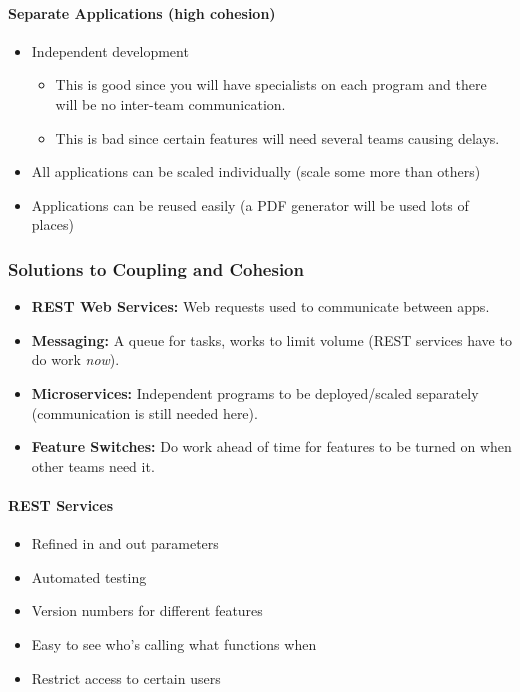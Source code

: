 \paragraph{Separate Applications (high cohesion)}\label{par:separate_applications_high_cohesion_}

\begin{itemize}
    \item Independent development
          \begin{itemize}
              \item This is good since you will have specialists on each program and there will be no inter-team communication.
              \item This is bad since certain features will need several teams causing delays.
          \end{itemize}
    \item All applications can be scaled individually (scale some more than others)
    \item Applications can be reused easily (a PDF generator will be used lots of places)
\end{itemize}

\subsubsection{Solutions to Coupling and Cohesion}\label{ssub:solutions_to_coupling_and_cohesion}

\begin{itemize}
    \item \textbf{REST Web Services:} Web requests used to communicate between apps.
    \item \textbf{Messaging:} A queue for tasks, works to limit volume (REST services have to do work \emph{now}).
    \item \textbf{Microservices:} Independent programs to be deployed/scaled separately (communication is still needed here).
    \item \textbf{Feature Switches:} Do work ahead of time for features to be turned on when other teams need it.
\end{itemize}

\paragraph{REST Services}\label{par:rest_services}

\begin{itemize}
    \item Refined in and out parameters
    \item Automated testing
    \item Version numbers for different features
    \item Easy to see who's calling what functions when
    \item Restrict access to certain users
\end{itemize}

